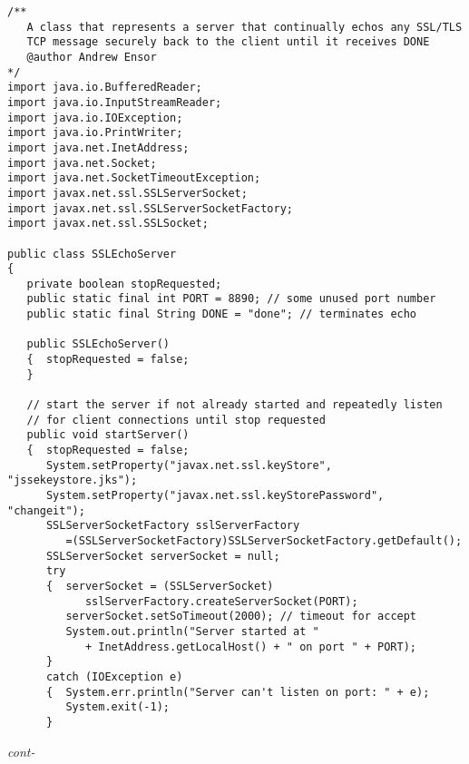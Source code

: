 \begin{figure*}\begin{program}\begin{verbatim}
/**
   A class that represents a server that continually echos any SSL/TLS
   TCP message securely back to the client until it receives DONE
   @author Andrew Ensor
*/
import java.io.BufferedReader;
import java.io.InputStreamReader;
import java.io.IOException;
import java.io.PrintWriter;
import java.net.InetAddress;
import java.net.Socket;
import java.net.SocketTimeoutException;
import javax.net.ssl.SSLServerSocket;
import javax.net.ssl.SSLServerSocketFactory;
import javax.net.ssl.SSLSocket;

public class SSLEchoServer
{
   private boolean stopRequested;
   public static final int PORT = 8890; // some unused port number
   public static final String DONE = "done"; // terminates echo

   public SSLEchoServer()
   {  stopRequested = false;
   }

   // start the server if not already started and repeatedly listen
   // for client connections until stop requested
   public void startServer()
   {  stopRequested = false;
      System.setProperty("javax.net.ssl.keyStore", "jssekeystore.jks");
      System.setProperty("javax.net.ssl.keyStorePassword", "changeit");
      SSLServerSocketFactory sslServerFactory
         =(SSLServerSocketFactory)SSLServerSocketFactory.getDefault();
      SSLServerSocket serverSocket = null;
      try
      {  serverSocket = (SSLServerSocket)
            sslServerFactory.createServerSocket(PORT);
         serverSocket.setSoTimeout(2000); // timeout for accept
         System.out.println("Server started at "
            + InetAddress.getLocalHost() + " on port " + PORT);
      }
      catch (IOException e)
      {  System.err.println("Server can't listen on port: " + e);
         System.exit(-1);
      }
\end{verbatim}\hfill \emph{cont-}\end{program}\end{figure*}%

